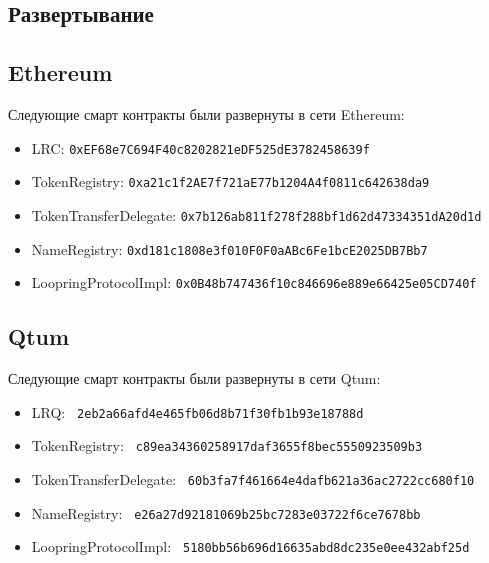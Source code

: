 \documentclass[utf8,nofonts]{article}
\begin{document}
\begin{appendices}
\section{Развертывание}

\subsection{Ethereum}
Следующие смарт контракты были развернуты в сети Ethereum:
\begin{itemize}
\item LRC: \verb|0xEF68e7C694F40c8202821eDF525dE3782458639f|
\item TokenRegistry: \verb|0xa21c1f2AE7f721aE77b1204A4f0811c642638da9|
\item TokenTransferDelegate: \verb|0x7b126ab811f278f288bf1d62d47334351dA20d1d|
\item NameRegistry: \verb|0xd181c1808e3f010F0F0aABc6Fe1bcE2025DB7Bb7|
\item LoopringProtocolImpl: \verb|0x0B48b747436f10c846696e889e66425e05CD740f|
\end{itemize}

\subsection{Qtum}
			Следующие смарт контракты были развернуты в сети Qtum:
\begin{itemize}
\item LRQ: \verb| 2eb2a66afd4e465fb06d8b71f30fb1b93e18788d |
\item TokenRegistry: \verb| c89ea34360258917daf3655f8bec5550923509b3 |
\item TokenTransferDelegate: \verb| 60b3fa7f461664e4dafb621a36ac2722cc680f10 |
\item NameRegistry: \verb| e26a27d92181069b25bc7283e03722f6ce7678bb |
\item LoopringProtocolImpl: \verb| 5180bb56b696d16635abd8dc235e0ee432abf25d |
\end{itemize}

\end{appendices}
\end{document}
